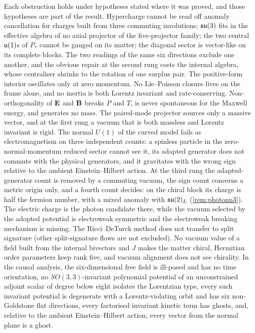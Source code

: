 Each obstruction holds under hypotheses stated where it was proved, and those hypotheses are part of the result. Hypercharge cannot be read off anomaly cancellation for
charges built from three commuting involutions; $\mathfrak{su}(3)$ fits in the effective algebra of no axial projector of the five-projector family; the two central $\mathfrak{u}(1)$s of $P_*$
cannot be gauged on its matter; the diagonal sector is vector-like on its complete blocks. The two readings of the same six directions exclude one another, and the
obvious repair at the second rung costs the internal algebra, whose centraliser shrinks to the rotation of one surplus pair. The positive-form interior oscillates only at zero momentum. No Lie--Poisson closure lives on the frame
alone, and no inertia is both Lorentz invariant and rate-conserving. Non-orthogonality of $\mathbf E$ and $\mathbf B$ breaks $P$ and $T$, is never spontaneous for the Maxwell energy, and generates no mass.
The paired-mode projector sources only a massive vector, and at the first rung a vacuum that is both massless and Lorentz invariant is rigid. The normal $U(1)$ of the curved
model fails as electromagnetism on three independent counts: a spinless particle in the zero-normal-momentum reduced sector cannot see it, its adapted generator does not commute with the physical generators, and it
gravitates with the wrong sign relative to the ambient Einstein--Hilbert action. At the third rung the adapted-generator count is removed by a commuting vacuum, the sign count concerns a metric origin only, and a
fourth count decides: on the chiral block its charge is half the fermion number, with a mixed anomaly with $\mathfrak{su}(2)_L$ (\cref{rem:photonn3}). The electric charge is the
photon candidate there, while the vacuum selected by the adopted potential is electroweak symmetric and the electroweak breaking mechanism is missing. The Ricci--DeTurck method does not transfer to split signature (other split-signature flows are not excluded). No vacuum value of a field built from the internal bivectors and $J$ makes the matter
chiral, Hermitian order parameters keep rank five, and vacuum alignment does not see chirality. In the causal analysis, the six-dimensional free field is ill-posed and has
no time orientation, no $SO(3,3)$-invariant polynomial potential of an unconstrained adjoint scalar of degree below eight isolates the Lorentzian type, every such
invariant potential is degenerate with a Lorentz-violating orbit and has six non-Goldstone flat directions, every factorised invariant kinetic term has ghosts, and,
relative to the ambient Einstein--Hilbert action, every vector from the normal plane is a ghost.

